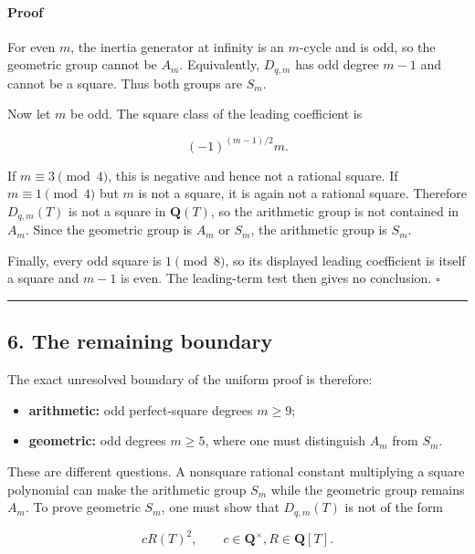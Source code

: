 \documentclass[11pt]{article}
\theoremstyle{keio}
\theoremstyle{definition}
\theoremstyle{remark}
\providecommand{\tightlist}{\setlength{\itemsep}{0pt}\setlength{\parskip}{0pt}}
\begin{document}
\paragraph{Proof}

For even \(m\), the inertia generator at infinity is an \(m\)-cycle and is
odd, so the geometric group cannot be \(A_m\). Equivalently,
\(D_{q,m}\) has odd degree \(m-1\) and cannot be a square. Thus both groups
are \(S_m\).

Now let \(m\) be odd. The square class of the leading coefficient is

\[
 (-1)^{(m-1)/2}m.
\]

If \(m\equiv3\pmod4\), this is negative and hence not a rational square. If
\(m\equiv1\pmod4\) but \(m\) is not a square, it is again not a rational
square. Therefore \(D_{q,m}(T)\) is not a square in \(\mathbf Q(T)\), so
the arithmetic group is not contained in \(A_m\). Since the geometric group
is \(A_m\) or \(S_m\), the arithmetic group is \(S_m\).

Finally, every odd square is \(1\pmod8\), so its displayed leading
coefficient is itself a square and \(m-1\) is even. The leading-term test
then gives no conclusion. \(\square\)

\begin{center}\rule{0.5\linewidth}{0.5pt}\end{center}

\subsection{6. The remaining boundary}

The exact unresolved boundary of the uniform proof is therefore:

\begin{itemize}
\tightlist
\item
  \textbf{arithmetic:} odd perfect-square degrees \(m\ge9\);
\item
  \textbf{geometric:} odd degrees \(m\ge5\), where one must distinguish \(A_m\)
  from \(S_m\).
\end{itemize}

These are different questions. A nonsquare rational constant multiplying a
square polynomial can make the arithmetic group \(S_m\) while the geometric
group remains \(A_m\). To prove geometric \(S_m\), one must show that
\(D_{q,m}(T)\) is not of the form

\[
 cR(T)^2,
 \qquad c\in\mathbf Q^\times, R\in\mathbf Q[T].
\]
\end{document}
